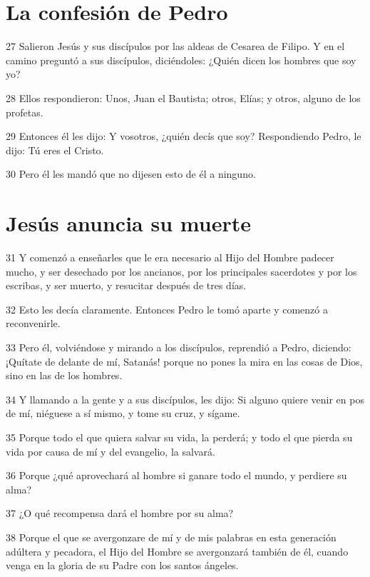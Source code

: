 \section*{La confesión de Pedro}

\par 27 Salieron Jesús y sus discípulos por las aldeas de Cesarea de Filipo. Y en el camino preguntó a sus discípulos, diciéndoles: ¿Quién dicen los hombres que soy yo?
\par 28 Ellos respondieron: Unos, Juan el Bautista; otros, Elías; y otros, alguno de los profetas.
\par 29 Entonces él les dijo: Y vosotros, ¿quién decís que soy? Respondiendo Pedro, le dijo: Tú eres el Cristo.
\par 30 Pero él les mandó que no dijesen esto de él a ninguno.

\section*{Jesús anuncia su muerte}

\par 31 Y comenzó a enseñarles que le era necesario al Hijo del Hombre padecer mucho, y ser desechado por los ancianos, por los principales sacerdotes y por los escribas, y ser muerto, y resucitar después de tres días.
\par 32 Esto les decía claramente. Entonces Pedro le tomó aparte y comenzó a reconvenirle.
\par 33 Pero él, volviéndose y mirando a los discípulos, reprendió a Pedro, diciendo: ¡Quítate de delante de mí, Satanás! porque no pones la mira en las cosas de Dios, sino en las de los hombres.
\par 34 Y llamando a la gente y a sus discípulos, les dijo: Si alguno quiere venir en pos de mí, niéguese a sí mismo, y tome su cruz, y sígame.
\par 35 Porque todo el que quiera salvar su vida, la perderá; y todo el que pierda su vida por causa de mí y del evangelio, la salvará.
\par 36 Porque ¿qué aprovechará al hombre si ganare todo el mundo, y perdiere su alma?
\par 37 ¿O qué recompensa dará el hombre por su alma?
\par 38 Porque el que se avergonzare de mí y de mis palabras en esta generación adúltera y pecadora, el Hijo del Hombre se avergonzará también de él, cuando venga en la gloria de su Padre con los santos ángeles.

